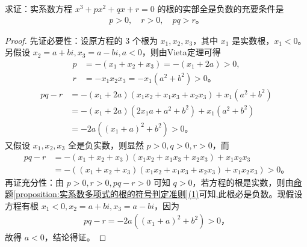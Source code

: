 \documentclass[../../main.tex]{subfiles}%
\begin{document}
\begin{example}
求证：实系数方程 $x^3 + px^2 + qx + r = 0$ 的根的实部全是负数的充要条件是
\begin{align*}
p > 0, \quad r > 0, \quad pq > r。
\end{align*}
\end{example}
\begin{proof}

先证必要性：设原方程的 3 个根为 $x_1, x_2, x_3$，其中 $x_1$ 是实数根，$x_1 < 0$。另假设 $x_2 = a + bi, x_3 = a - bi, a < 0$，则由Vieta定理可得
\begin{align*}
p &= -(x_1 + x_2 + x_3) = -(x_1 + 2a) > 0, \\
r &= -x_1 x_2 x_3 = -x_1(a^2 + b^2) > 0。
\end{align*}
\begin{align*}
pq - r &= -(x_1 + 2a)(x_1 x_2 + x_1 x_3 + x_2 x_3) + x_1(a^2 + b^2) \\
&= -(x_1 + 2a)(2x_1 a + a^2 + b^2) + x_1(a^2 + b^2) \\
&= -2a((x_1 + a)^2 + b^2) > 0。
\end{align*}
又假设 $x_1, x_2, x_3$ 全是负实数，则显然 $p > 0, q > 0, r > 0$，而
\begin{align*}
pq - r &= -(x_1 + x_2 + x_3)(x_1 x_2 + x_1 x_3 + x_2 x_3) + x_1 x_2 x_3 \\
&= -((x_1 + x_2 + x_3)(x_1 x_2 + x_1 x_3 + x_2 x_3) + x_1 x_2 x_3) > 0。
\end{align*}
再证充分性：由 $p > 0, r > 0, pq - r > 0$ 可知 $q > 0$，若方程的根是实数，则由\hyperref[proposition:实系数多项式的根的符号判定准则]{命题\ref{proposition:实系数多项式的根的符号判定准则}(1)}可知,此根必是负数。现假设方程有根 $x_1 < 0, x_2 = a + bi, x_3 = a - bi$，因为
\begin{align*}
pq - r = -2a((x_1 + a)^2 + b^2) > 0，
\end{align*}
故得 $a < 0$，结论得证。

\end{proof}
\end{document}
